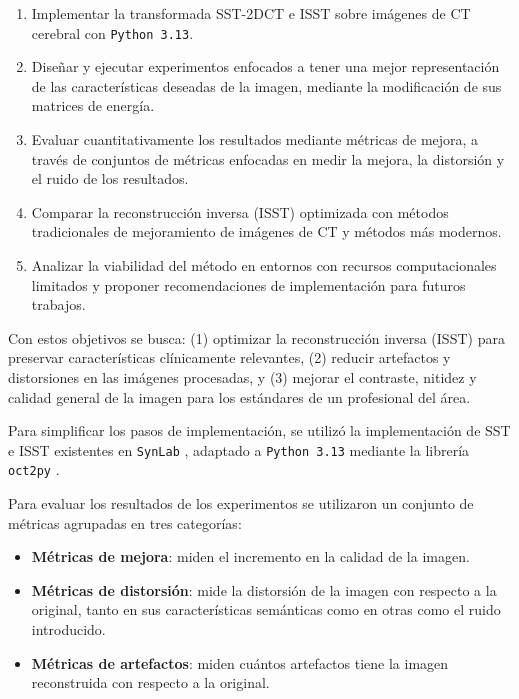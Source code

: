 \begin{enumerate}
    \item Implementar la transformada SST-2DCT e ISST sobre imágenes de CT cerebral con \texttt{Python 3.13}.
    \item Diseñar y ejecutar experimentos enfocados a tener una mejor representación de las características deseadas de la imagen, mediante la modificación de sus matrices de energía.
    \item Evaluar cuantitativamente los resultados mediante métricas de mejora, a través de conjuntos de métricas enfocadas en medir la mejora, la distorsión y el ruido de los resultados.
    \item Comparar la reconstrucción inversa (ISST) optimizada con métodos tradicionales de mejoramiento de imágenes de CT y métodos más modernos.
    \item Analizar la viabilidad del método en entornos con recursos computacionales limitados y proponer recomendaciones de implementación para futuros trabajos.
\end{enumerate}

Con estos objetivos se busca: (1) optimizar la reconstrucción inversa (ISST) para preservar características clínicamente relevantes, (2) reducir artefactos y distorsiones en las imágenes procesadas, y (3) mejorar el contraste, nitidez y calidad general de la imagen para los estándares de un profesional del área.

Para simplificar los pasos de implementación, se utilizó la implementación de SST e ISST existentes en \texttt{SynLab} \cite{SynchrosqueezedCurveletTransform,SynchrosqueezedCurveletTransform_SynLab}, adaptado a \texttt{Python 3.13} mediante la librería \texttt{oct2py} \cite{oct2py}.

Para evaluar los resultados de los experimentos se utilizaron un conjunto de métricas agrupadas en tres categorías:

\begin{itemize}
    \item \textbf{Métricas de mejora}: miden el incremento en la calidad de la imagen.
    \item \textbf{Métricas de distorsión}: mide la distorsión de la imagen con respecto a la original, tanto en sus características semánticas como en otras como el ruido introducido.
    \item \textbf{Métricas de artefactos}: miden cuántos artefactos tiene la imagen reconstruida con respecto a la original.
\end{itemize}

